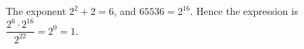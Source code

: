 The exponent $2^2+2=6$, and $65536=2^{16}$. Hence the expression is $\dfrac{2^6\cdot 2^{16}}{2^{22}}=2^0=\boxed 1$.
